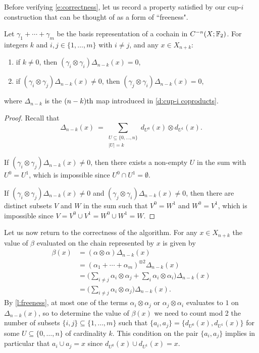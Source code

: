 Before verifying \eqref{e:correctness}, let us record a property satisfied by our cup-$i$ construction that can be thought of as a form of ``freeness".

\begin{lemma} \label{l:freeness}
	Let $\gamma_1 + \cdots + \gamma_m$ be the basis representation of a cochain in $C^{-n}(X; {\mathbb{F}_2})$.
	For integers $k$ and $i, j \in \{1, \dots, m\}$ with $i \neq j$, and any $x \in X_{n+k}$:
	\begin{enumerate}
		\item if $k \neq 0$, then $(\gamma_i \otimes \gamma_i)\Delta_{n-k}(x) = 0$,
		\item if $(\gamma_i \otimes \gamma_j)\Delta_{n-k}(x) \neq 0$, then $(\gamma_j \otimes \gamma_i)\Delta_{n-k}(x) = 0$,
	\end{enumerate}
	where $\Delta_{n-k}$ is the $(n-k)\mathrm{th}$ map introduced in \cref{d:cup-i coproducts}.
\end{lemma}

\begin{proof}
	Recall that
	\begin{equation*}
	\Delta_{n-k}(x) \ = \! \sum_{\substack{U \subseteq \{0, \dots, n\} \\ \vert U \vert = k}}
	d_{U^0}(x) \otimes d_{U^1}(x).
	\end{equation*}

	If $(\gamma_i \otimes \gamma_j)\Delta_{n-k}(x) \neq 0$, then there exists a non-empty $U$ in the sum with $U^0 = U^1$, which is impossible since $U^0 \cap U^1 = \emptyset$.

	If $(\gamma_i \otimes \gamma_j)\Delta_{n-k}(x) \neq 0$ and $(\gamma_j \otimes \gamma_i)\Delta_{n-k}(x) \neq 0$, then there are distinct subsets $V$ and $W$ in the sum such that $V^0 = W^1$ and $W^0 = V^1$, which is impossible since $V = V^0 \cup V^1 = W^0 \cup W^1 = W$.
\end{proof}

Let us now return to the correctness of the algorithm.
For any $x \in X_{n+k}$ the value of $\beta$ evaluated on the chain represented by $x$ is given by
\begin{align*}
\beta(x) & =
(\alpha \otimes \alpha) \Delta_{n-k}(x) \\ & =
(\alpha_1 + \cdots + \alpha_m)^{\otimes 2} \Delta_{n-k}(x) \\ & =
\Big(\sum_{i \neq j} \alpha_i \otimes \alpha_j + \sum_{i} \alpha_i \otimes \alpha_i \Big)
\Delta_{n-k}(x) \\ & =
\Big(\sum_{i \neq j} \alpha_i \otimes \alpha_j\Big)
\Delta_{n-k}(x).
\end{align*}
By \cref{l:freeness}, at most one of the terms $\alpha_i \otimes \alpha_j$ or $\alpha_j \otimes \alpha_i$ evaluates to $1$ on $\Delta_{n-k}(x)$, so to determine the value of $\beta(x)$ we need to count mod 2 the number of subsets $\{i,j\} \subseteq \{1,\dots, m\}$ such that $\{a_i, a_j\} = \{d_{U^0}(x), d_{U^1}(x)\}$ for some $U \subseteq \{0, \dots, n\}$ of cardinality $k$.
This condition on the pair $\{a_i, a_j\}$ implies in particular that $a_i \cup a_j = x$ since $d_{U^0}(x) \cup d_{U^1}(x) = x$.

